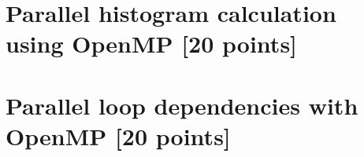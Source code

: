 \documentclass[unicode,11pt,a4paper,oneside,numbers=endperiod,openany]{scrartcl}
\begin{document}
\section{Parallel histogram calculation using OpenMP [20 points]}



\section{Parallel loop dependencies with OpenMP [20 points]}
\end{document}
